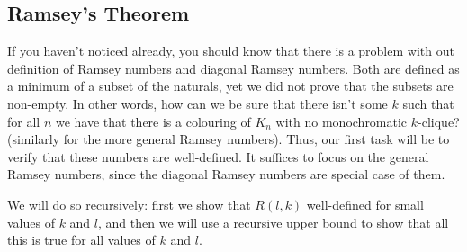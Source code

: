 \documentclass{report}
\theoremstyle{definition}
\theoremstyle{plain}
\theoremstyle{definition}
\begin{document}
	\subsection{Ramsey's Theorem}
	If you haven't noticed already, you should know that there is a problem with out definition of Ramsey numbers and diagonal Ramsey numbers. Both are defined as a minimum of a subset of the naturals, yet we did not prove that the subsets are non-empty. In other words, how can we be sure that there isn't some $k$ such that for all $n$ we have that there is a colouring of $K_n$ with no monochromatic $k$-clique? (similarly for the more general Ramsey numbers). Thus, our first task will be to verify that these numbers are well-defined. It suffices to focus on the general Ramsey numbers, since the diagonal Ramsey numbers are special case of them.
	
	We will do so recursively: first we show that $R(l,k)$ well-defined for small values of $k$ and $l$, and then we will use a recursive upper bound to show that all this is true for all values of $k$ and $l$.
	
\end{document}
